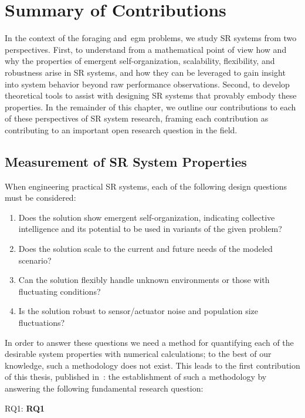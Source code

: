 \section{Summary of Contributions}
%
In the context of the foraging and~\gls{egm} problems, we study SR systems from
two perspectives. First, to understand from a mathematical point of view how and
why the properties of emergent self-organization, scalability, flexibility, and
robustness arise in SR systems, and how they can be leveraged to gain insight
into system behavior beyond raw performance observations. Second, to develop
theoretical tools to assist with designing SR systems that provably embody these
properties.  In the remainder of this chapter, we outline our contributions to
each of these perspectives of SR system research, framing each contribution as
contributing to an important open research question in the field.

\subsection{Measurement of SR System Properties }
%
When engineering practical SR systems, each of the following design
questions must be considered:
%
\begin{enumerate}
\item {Does the solution show emergent self-organization, indicating collective
    intelligence and its potential to be used in variants of the given problem?
  }
\item{Does the solution scale to the current and future needs of the modeled
    scenario?}
\item {Can the solution flexibly handle unknown environments or those with
    fluctuating conditions?}
\item {Is the solution robust to sensor/actuator noise and population size
    fluctuations?
  }
\end{enumerate}
%
In order to answer these questions we need a method for quantifying each of the
desirable system properties with numerical calculations; to the best of our
knowledge, such a methodology does not exist. This leads to the first
contribution of this thesis, published in~\cite{Harwell2021a}: the establishment
of such a methodology by answering the following fundamental research question:

\medskip\noindent
\gls{RQ1}: \textbf{\Glsdesc{RQ1}}
\medskip

